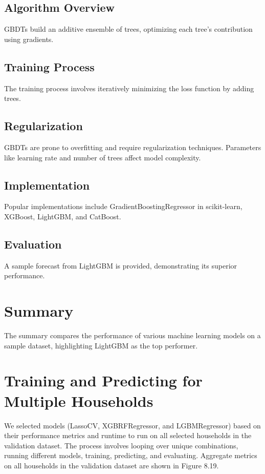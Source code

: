 \documentclass{article}
\begin{document}
\subsection{Algorithm Overview}
GBDTs build an additive ensemble of trees, optimizing each tree's contribution using gradients.

\subsection{Training Process}
The training process involves iteratively minimizing the loss function by adding trees.

\subsection{Regularization}
GBDTs are prone to overfitting and require regularization techniques. Parameters like learning rate and number of trees affect model complexity.

\subsection{Implementation}
Popular implementations include GradientBoostingRegressor in scikit-learn, XGBoost, LightGBM, and CatBoost.

\subsection{Evaluation}
A sample forecast from LightGBM is provided, demonstrating its superior performance.

\section{Summary}
The summary compares the performance of various machine learning models on a sample dataset, highlighting LightGBM as the top performer.

\section{Training and Predicting for Multiple Households}
We selected models (LassoCV, XGBRFRegressor, and LGBMRegressor) based on their performance metrics and runtime to run on all selected households in the validation dataset. The process involves looping over unique combinations, running different models, training, predicting, and evaluating. Aggregate metrics on all households in the validation dataset are shown in Figure 8.19.
\end{document}
